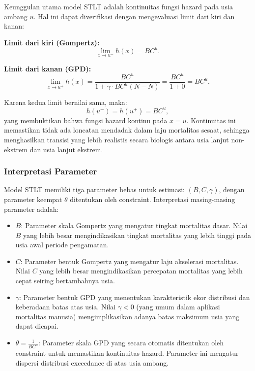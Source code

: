 Keunggulan utama model STLT adalah kontinuitas fungsi hazard pada usia ambang $u$. Hal ini dapat diverifikasi dengan mengevaluasi limit dari kiri dan kanan:

\textbf{Limit dari kiri (Gompertz):}
\begin{equation}
\lim_{x \to u^-} h(x) = BC^u.
\label{eq:hazard_left_limit}
\end{equation}

\textbf{Limit dari kanan (GPD):}
\begin{equation}
\lim_{x \to u^+} h(x) = \frac{BC^u}{1 + \gamma \cdot BC^u(N-N)} = \frac{BC^u}{1 + 0} = BC^u.
\label{eq:hazard_right_limit}
\end{equation}

Karena kedua limit bernilai sama, maka:
\begin{equation}
h(u^-) = h(u^+) = BC^u,
\label{eq:hazard_continuity}
\end{equation}
yang membuktikan bahwa fungsi hazard kontinu pada $x = u$. Kontinuitas ini memastikan tidak ada loncatan mendadak dalam laju mortalitas sesaat, sehingga menghasilkan transisi yang lebih realistis secara biologis antara usia lanjut non-ekstrem dan usia lanjut ekstrem.

\subsubsection{Interpretasi Parameter}

Model STLT memiliki tiga parameter bebas untuk estimasi: $(B, C, \gamma)$, dengan parameter keempat $\theta$ ditentukan oleh constraint. Interpretasi masing-masing parameter adalah:

\begin{itemize}
    \item \textbf{$B$}: Parameter skala Gompertz yang mengatur tingkat mortalitas dasar. Nilai $B$ yang lebih besar mengindikasikan tingkat mortalitas yang lebih tinggi pada usia awal periode pengamatan.
    
    \item \textbf{$C$}: Parameter bentuk Gompertz yang mengatur laju akselerasi mortalitas. Nilai $C$ yang lebih besar mengindikasikan percepatan mortalitas yang lebih cepat seiring bertambahnya usia.
    
    \item \textbf{$\gamma$}: Parameter bentuk GPD yang menentukan karakteristik ekor distribusi dan keberadaan batas atas usia. Nilai $\gamma < 0$ (yang umum dalam aplikasi mortalitas manusia) mengimplikasikan adanya batas maksimum usia yang dapat dicapai.
    
    \item \textbf{$\theta = \frac{1}{BC^u}$}: Parameter skala GPD yang secara otomatis ditentukan oleh constraint untuk memastikan kontinuitas hazard. Parameter ini mengatur dispersi distribusi exceedance di atas usia ambang.
\end{itemize}

